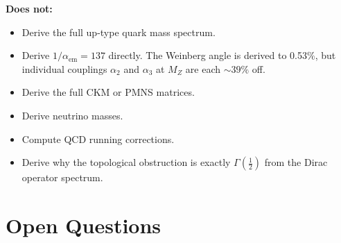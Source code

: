\documentclass[12pt,a4paper]{article}
\begin{document}
\textbf{Does not:}
\begin{itemize}
\item Derive the full up-type quark mass spectrum.
\item Derive $1/\alpha_{\text{em}} = 137$ directly. The Weinberg angle is derived to 0.53\%, but individual couplings $\alpha_2$ and $\alpha_3$ at $M_Z$ are each $\sim 39\%$ off.
\item Derive the full CKM or PMNS matrices.
\item Derive neutrino masses.
\item Compute QCD running corrections.
\item Derive why the topological obstruction is exactly $\Gamma(\tfrac{1}{2})$ from the Dirac operator spectrum.
\end{itemize}

\section{Open Questions}
\end{document}
